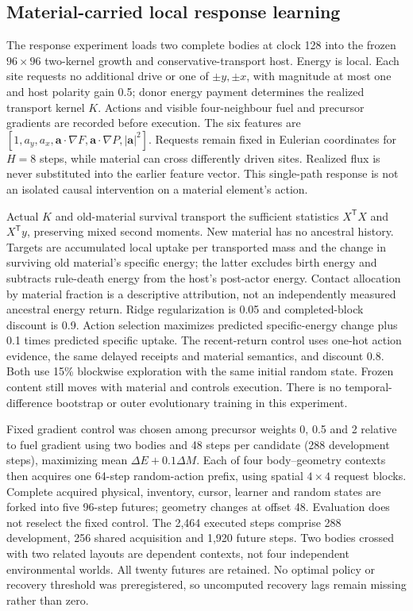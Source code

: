 \subsection*{Material-carried local response learning}
The response experiment loads two complete bodies at clock 128 into the frozen $96\times96$ two-kernel growth and conservative-transport host. Energy is local. Each site requests no additional drive or one of $\pm y,\pm x$, with magnitude at most one and host polarity gain 0.5; donor energy payment determines the realized transport kernel $K$. Actions and visible four-neighbour fuel and precursor gradients are recorded before execution. The six features are $[1,a_y,a_x,\mathbf a\cdot\nabla F,\mathbf a\cdot\nabla P,|\mathbf a|^2]$. Requests remain fixed in Eulerian coordinates for $H=8$ steps, while material can cross differently driven sites. Realized flux is never substituted into the earlier feature vector. This single-path response is not an isolated causal intervention on a material element's action.

Actual $K$ and old-material survival transport the sufficient statistics $X^{\mathsf T}X$ and $X^{\mathsf T}y$, preserving mixed second moments. New material has no ancestral history. Targets are accumulated local uptake per transported mass and the change in surviving old material's specific energy; the latter excludes birth energy and subtracts rule-death energy from the host's post-actor energy. Contact allocation by material fraction is a descriptive attribution, not an independently measured ancestral energy return. Ridge regularization is 0.05 and completed-block discount is 0.9. Action selection maximizes predicted specific-energy change plus 0.1 times predicted specific uptake. The recent-return control uses one-hot action evidence, the same delayed receipts and material semantics, and discount 0.8. Both use 15\% blockwise exploration with the same initial random state. Frozen content still moves with material and controls execution. There is no temporal-difference bootstrap or outer evolutionary training in this experiment.

Fixed gradient control was chosen among precursor weights 0, 0.5 and 2 relative to fuel gradient using two bodies and 48 steps per candidate (288 development steps), maximizing mean $\Delta E+0.1\Delta M$. Each of four body--geometry contexts then acquires one 64-step random-action prefix, using spatial $4\times4$ request blocks. Complete acquired physical, inventory, cursor, learner and random states are forked into five 96-step futures; geometry changes at offset 48. Evaluation does not reselect the fixed control. The 2,464 executed steps comprise 288 development, 256 shared acquisition and 1,920 future steps. Two bodies crossed with two related layouts are dependent contexts, not four independent environmental worlds. All twenty futures are retained. No optimal policy or recovery threshold was preregistered, so uncomputed recovery lags remain missing rather than zero.

